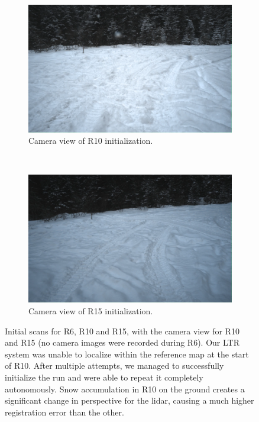 \begin{figure}[tpbh!]
\begin{center}
\begin{subfigure}[b]{0.07\textwidth}
			\label{fig:cbar_run10}
			\vspace{0.2in}
		\end{subfigure}%
		\\
		\begin{subfigure}[b]{0.45\textwidth}
			\includegraphics[width=\linewidth]{figs/run10_init_fail/run10_init.pdf}
			\caption{Camera view of R10 initialization.}
			\label{fig:r10_cam}
		\end{subfigure}%
		~
		\begin{subfigure}[b]{0.45\textwidth}
			\includegraphics[width=\linewidth]{figs/run10_init_fail/run15_init.pdf}
			\caption{Camera view of R15 initialization.}
			\label{fig:r15_cam}
		\end{subfigure}%
		\caption{Initial scans for R6, R10 and R15, with the camera view for R10 and R15 (no camera images were recorded during R6).
		Our \ac{LTR} system was unable to localize within the reference map at the start of R10.
		After multiple attempts, we managed to successfully initialize the run and were able to repeat it completely autonomously.
		Snow accumulation in R10 on the ground creates a significant change in perspective for the lidar, causing a much higher registration error than the other.} 
		\label{fig:icp_failure_r10}
	\end{center}
\end{figure}